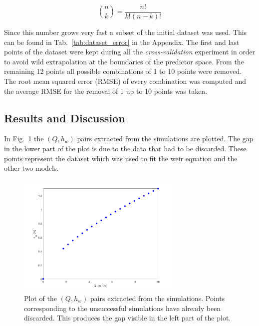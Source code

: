 \begin{equation}
  \binom{n}{k} = \frac{n!}{k!\left(n-k\right)!}
\end{equation}

\noindent Since this number grows very fast a subset of the initial dataset was used.
This can be found in Tab.~\ref{tab:dataset_error} in the Appendix.
The first and last points of the dataset were kept during all the \emph{cross-validation} experiment in order to avoid wild extrapolation at the boundaries of the predictor space.
From the remaining \num{12} points all possible combinations of \num{1} to \num{10} points were removed.
The root mean squared error (RMSE) of every combination was computed and the average RMSE for the removal of \num{1} up to \num{10} points was taken.


\subsection{Results and Discussion}


In Fig.~\ref{fig:simulations_results} the $(Q, h_w)$ pairs extracted from the simulations are plotted.
The gap in the lower part of the plot is due to the data that had to be discarded.
These points represent the dataset which was used to fit the weir equation and the other two models.

\begin{figure}[h]
  \centering
  \includegraphics[width=0.7\textwidth]{Figures/simulations_results.png}
  \caption{Plot of the $(Q, h_w)$ pairs extracted from the simulations. Points corresponding to the unsuccessful simulations have already been discarded. This produces the gap visible in the left part of the plot.}
  \label{fig:simulations_results}
\end{figure}

